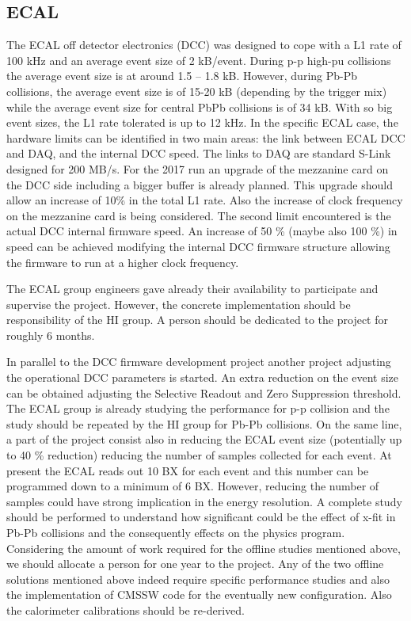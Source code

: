 \subsection{ECAL\label{subsec:ECAL}} 
The ECAL off detector electronics (DCC) was designed to cope with a L1 rate of 100 kHz and an average event size of 2 kB/event. During p-p high-pu collisions the average event size is at around 1.5 – 1.8 kB. However, during Pb-Pb collisions, the average event size is of 15-20 kB (depending by the trigger mix) while the average event size for central PbPb collisions is of 34 kB. With so big event sizes, the L1 rate tolerated is up to 12 kHz. In the specific ECAL case, the hardware limits can be identified in two main areas: the link between ECAL DCC and DAQ, and the internal DCC speed. The links to DAQ are standard S-Link designed for 200 MB/s. For the 2017 run an upgrade of the mezzanine card on the DCC
side including a bigger buffer is already planned. This upgrade should allow an increase of 10\% in the total L1 rate. Also the increase of clock frequency on the mezzanine card is being considered. The second limit encountered is the actual DCC internal firmware speed. An increase of 50 \% (maybe also 100 \%) in speed can be achieved modifying the internal DCC firmware structure allowing the firmware to run at a higher clock frequency. 

The ECAL group engineers gave already their availability to participate and supervise the project. However, the concrete implementation should be responsibility of the HI group. A person should be dedicated to the project for roughly 6 months. 

In parallel to the DCC firmware development project another project adjusting the operational DCC parameters is started. An extra reduction on the event size can be obtained adjusting the Selective Readout and Zero Suppression threshold. The ECAL group is already studying the performance for p-p collision and the study should be repeated by the HI group for Pb-Pb collisions. On the same line, a part of the project consist also in reducing the ECAL event size (potentially up to 40 \% reduction) reducing the number of samples collected for each event. At present the ECAL reads out 10 BX for each event
and this number can be programmed down to a minimum of 6 BX. However, reducing the number of samples could have strong implication in the energy resolution. A complete study should be performed to understand how significant could be the effect of x-fit in Pb-Pb collisions and the consequently effects on the physics program. Considering the amount of work required for the offline studies mentioned above, we should allocate a person for one year to the project. Any of the two offline solutions mentioned above indeed require specific performance studies and also the implementation of CMSSW code for the eventually new configuration. Also the calorimeter calibrations should be re-derived. 




